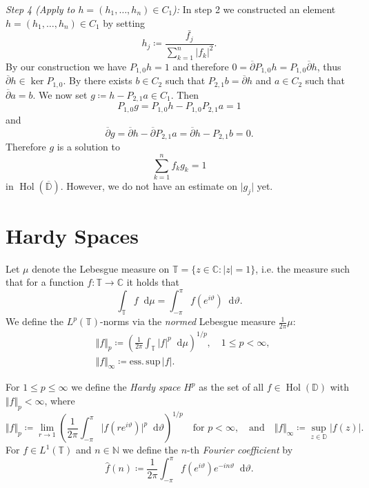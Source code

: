 \documentclass[letterpaper, 11pt]{article}
\newcommand{\C}{\mathbb{C}}
\newcommand{\D}{\mathbb{D}}
\newcommand{\T}{\mathbb{T}}
\newcommand{\N}{\mathbb{N}}
\newcommand{\1}{\mathds{1}}
\newcommand{\diff}{\mathop{}\!\mathrm{d}}
\newcommand{\cl}[1]{\overline{#1}}
\newcommand{\wirtzbar}{\overline{\partial}}
\DeclareMathOperator*{\Hol}{Hol}
\theoremstyle{definition}
\newenvironment{innerproof}
 {\renewcommand{\qedsymbol}{}\proof}
 {\endproof}
\begin{document}
\begin{innerproof}[Proof (continued)]
  \textit{Step 4 (Apply to $h = (h_1, \dots, h_n) \in C_1$):} In step 2 we constructed an element $h = (h_1, \dots, h_n) \in C_1$ by setting
  $$ h_j \coloneqq \frac{\bar{f_j}}{\sum_{k=1}^n \vert f_k \vert^2}. $$
  By our construction we have $P_{1,0} h = 1$ and therefore $0 = \wirtzbar P_{1,0} h = P_{1,0} \wirtzbar h$, thus $\wirtzbar h \in \ker P_{1,0}$. By  there exists $b \in C_2$ such that $P_{2,1} b = \wirtzbar h$ and $a \in C_2$ such that $\wirtzbar a = b$. We now set $g \coloneqq h - P_{2,1} a \in C_1$. Then
  $$ P_{1,0} g = P_{1,0} h - P_{1,0} P_{2,1} a = 1 $$
  and
  $$ \wirtzbar g = \wirtzbar h - \wirtzbar P_{2,1} a = \wirtzbar h - P_{2,1} b = 0. $$
  Therefore $g$ is a solution to
  $$ \sum_{k=1}^n f_k g_k = 1 $$
  in $\Hol(\cl{\D})$. However, we do not have an estimate on $\vert g_j \vert$ yet.
\end{innerproof}

\section{Hardy Spaces}

Let $\mu$ denote the Lebesgue measure on $\T = \{ z \in \C : \vert z \vert = 1 \}$, i.e. the measure such that for a function $f : \T \to \C$ it holds that
$$ \int_\T f \diff \mu = \int_{-\pi}^\pi f(e^{i \vartheta}) \diff \vartheta. $$
We define the $L^p(\T)$-norms via the \emph{normed} Lebesgue measure $\frac{1}{2 \pi} \mu$:
\begin{align*}
  &\Vert f \Vert_p \coloneqq \left( \frac{1}{2\pi} \int_\T \vert f \vert^p \diff \mu \right)^{1/p}, \quad 1 \leq p < \infty, \\
  &\Vert f \Vert_\infty \coloneqq \mathrm{ess.\,sup\,} \vert f \vert.
\end{align*}

For $1 \leq p \leq \infty$ we define the \emph{Hardy space} $H^p$ as the set of all $f \in \Hol(\D)$ with $\Vert f \Vert_p < \infty$, where
$$ \Vert f \Vert_p \coloneqq \lim_{r \to 1} \left( \frac{1}{2 \pi} \int_{-\pi}^{\pi} \vert f(r e^{i \vartheta}) \vert^p \diff \vartheta \right)^{1/p} \quad \textrm{for } p < \infty, \quad \textrm{and} \quad \Vert f \Vert_\infty \coloneqq \sup_{z \in \D} \vert f(z) \vert. $$
For $f \in L^1(\T)$ and $n \in \N$ we define the $n$-th \emph{Fourier coefficient} by
$$ \hat{f}(n) \coloneqq \frac{1}{2\pi} \int_{-\pi}^{\pi} f(e^{i \vartheta}) e^{-i n \vartheta} \diff \vartheta. $$
\end{document}
